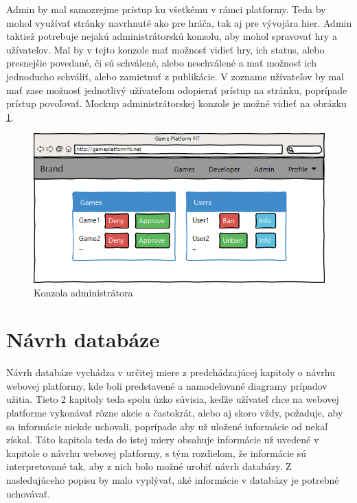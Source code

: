 Admin by mal samozrejme prístup ku všetkému v rámci platformy. Teda by mohol využívať stránky navrhnuté ako pre hráča, tak aj pre vývojára hier. Admin taktiež potrebuje nejakú administrátorskú konzolu, aby mohol spravovať hry a užívateľov. Mal by v tejto konzole mať možnosť vidieť hry, ich status, alebo presnejšie povedané, či sú schválené, alebo neschválené a mať možnosť ich jednoducho schváliť, alebo zamietnuť z publikácie. V zozname užívateľov by mal mať zase možnosť jednotlivý užívateľom odopierať prístup na stránku, poprípade prístup povoľovať. Mockup administrátorskej konzole je možné vidieť na obrázku \ref{fig:guiadmin}.
\begin{figure}[h]
  \centering
  \includegraphics[scale=0.35]{fig/gui-admin.png}
  \caption{Konzola administrátora}
  \label{fig:guiadmin}
\end{figure}

\section{Návrh databáze}
Návrh databáze vychádza v určitej miere z predchádzajúcej kapitoly o návrhu webovej platformy, kde boli predstavené a namodelované diagramy prípadov užitia. Tieto 2 kapitoly teda spolu úzko súvisia, keďže užívateľ chce na webovej platforme vykonávať rôzne akcie a častokrát, alebo aj skoro vždy, požaduje, aby sa informácie niekde uchovali, poprípade aby už uložené informácie od nekaľ získal. Táto kapitola teda do istej miery obsahuje informácie už uvedené v kapitole o návrhu webovej platformy, s tým rozdielom, že informácie sú interpretované tak, aby z nich bolo možné urobiť návrh databázy. Z nasledujúceho popisu by malo vyplývať, aké informácie v databázy je potrebné uchovávať. 

